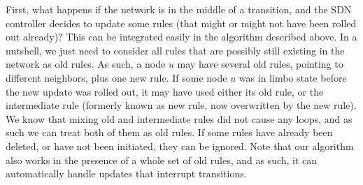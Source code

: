 First, what happens if the network is in the middle of a transition, and the SDN controller decides to update some rules (that might or might not have been rolled out already)? This can be integrated easily in the algorithm described above. In a nutshell, we just need to consider all rules that are possibly still existing in the network as old rules. As such, a node $u$ may have several old rules, pointing to different neighbors, plus one new rule. If some node $u$ was in limbo state before the new update was rolled out, it may have used either its old rule, or the intermediate rule (formerly known as new rule, now overwritten by the new rule). We know that mixing old and intermediate rules did not cause any loops, and as such we can treat both of them as old rules. If some rules have already been deleted, or have not been initiated, they can be ignored. Note that our algorithm also works in the presence of a whole set of old rules, and as such, it can automatically handle updates that interrupt transitions.



